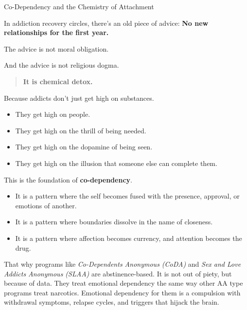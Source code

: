 \medskip 

\begin{PhilosophicalSidebar}{Co-Dependency and the Chemistry of Attachment}

    In addiction recovery circles, there’s an old piece of advice:  
    \textbf{No new relationships for the first year.}

    \medskip
    
    The advice is not moral obligation. 

    And the advice is not religious dogma.  

    \medskip

    \begin{quote}
        \centering
        \textbf{It is chemical detox.}
    \end{quote}

    \medskip
    
    Because addicts don’t just get high on substances.  

    \medskip

    \begin{itemize}
        \item They get high on people.  
        \item They get high on the thrill of being needed.  
        \item They get high on the dopamine of being seen.  
        \item They get high on the illusion that someone else can complete them.
    \end{itemize}
    
    \medskip
    
    This is the foundation of \textbf{co-dependency}.  

    \medskip

    \begin{itemize}
        \item It is a pattern where the self becomes fused with the presence, approval, or emotions of another.  
        \item It is a pattern where boundaries dissolve in the name of closeness.  
        \item It is a pattern where affection becomes currency, and attention becomes the drug.
    \end{itemize}
    
    \medskip

    That why programs like 
    \textit{Co-Dependents Anonymous (CoDA)} and
    \textit{Sex and Love Addicts Anonymous (SLAA)}
    are abstinence-based.
    It is not out of piety, but because of data.  
    They treat emotional dependency the same way other AA type programs treat narcotics. 
    Emotional dependency for them is a compulsion with withdrawal symptoms, relapse cycles, 
    and triggers that hijack the brain.


\end{PhilosophicalSidebar}
